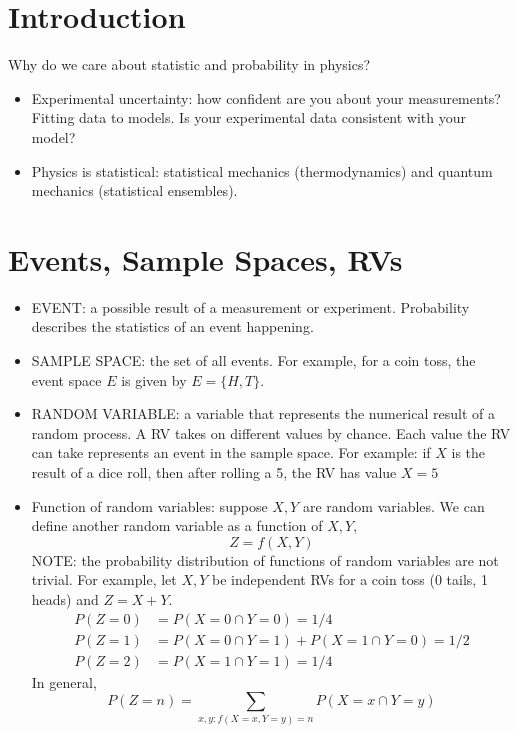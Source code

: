 \documentclass[12pt]{article}
\numberwithin{equation}{section}
\begin{document}
	
\section{Introduction}

Why do we care about statistic and probability in physics?
\begin{itemize}
	\item Experimental uncertainty: how confident are you about your measurements? Fitting data to models. Is your experimental data consistent with your model? 
	\item Physics is statistical: statistical mechanics (thermodynamics) and quantum mechanics (statistical ensembles).
\end{itemize}

\section{Events, Sample Spaces, RVs}

\begin{itemize}
	\item EVENT: a possible result of a measurement or experiment. Probability describes the statistics of an event happening.
	\item SAMPLE SPACE: the set of all events. For example, for a coin toss, the event space $ E $ is given by $ E = \{H, T\} $.
	\item RANDOM VARIABLE: a variable that represents the numerical result of a random process.  A RV takes on different values by chance. Each value the RV can take represents an event in the sample space. For example: if $ X $ is the result of a dice roll, then after rolling a 5, the RV has value $ X=5 $
	\item Function of random variables: suppose $ X,Y $ are random variables. We can define another random variable as a function of $ X,Y $,
	\begin{equation}
			Z = f(X,Y)
	\end{equation}
NOTE: the probability distribution of functions of random variables are not trivial. For example, let $ X,Y $ be independent RVs for a coin toss (0 tails, 1 heads) and $ Z = X+Y $.
\begin{align}
	P(Z=0) &= P(X=0\cap Y=0) = 1/4\\
	P(Z=1) &= P(X=0\cap Y=1) + P(X=1\cap Y=0) = 1/2\\
	P(Z=2) &= P(X=1\cap Y=1) = 1/4
\end{align}
In general,
\begin{equation}
		P(Z=n) = \sum_{x,y: f(X=x,Y=y)=n}P(X=x\cap Y=y)
\end{equation}
\end{itemize}
\end{document}
